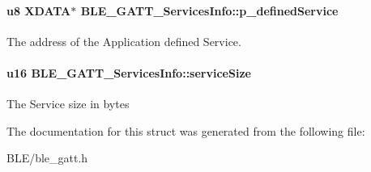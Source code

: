 \paragraph[{\texorpdfstring{p\+\_\+defined\+Service}{p_definedService}}]{\setlength{\rightskip}{0pt plus 5cm}u8 X\+D\+A\+TA$\ast$ B\+L\+E\+\_\+\+G\+A\+T\+T\+\_\+\+Services\+Info\+::p\+\_\+defined\+Service}\hypertarget{struct_b_l_e___g_a_t_t___services_info_aeb0741e1cff915d6a636b33b30ea6009}{}\label{struct_b_l_e___g_a_t_t___services_info_aeb0741e1cff915d6a636b33b30ea6009}
The address of the Application defined Service. 
\paragraph[{\texorpdfstring{service\+Size}{serviceSize}}]{\setlength{\rightskip}{0pt plus 5cm}u16 B\+L\+E\+\_\+\+G\+A\+T\+T\+\_\+\+Services\+Info\+::service\+Size}\hypertarget{struct_b_l_e___g_a_t_t___services_info_a4e360af9555faca76a51bc82aaec3dff}{}\label{struct_b_l_e___g_a_t_t___services_info_a4e360af9555faca76a51bc82aaec3dff}
The Service size in bytes 

The documentation for this struct was generated from the following file\+:\begin{DoxyCompactItemize}
\item 
B\+L\+E/ble\+\_\+gatt.\+h\end{DoxyCompactItemize}
